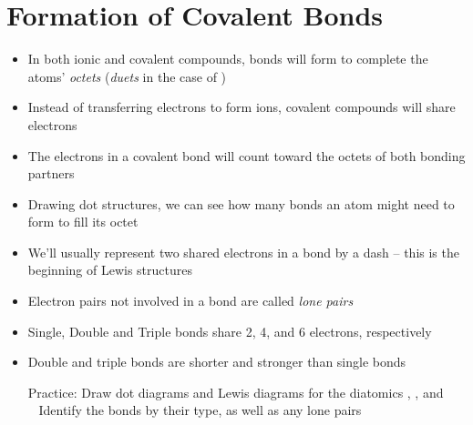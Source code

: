 \documentclass[12pt, openany, letterpaper]{memoir}
\begin{document}
\section{Formation of Covalent Bonds}
\begin{itemize}
	\item In both ionic and covalent compounds, bonds will form to complete the atoms' \emph{octets} (\emph{duets} in the case of )
	\item Instead of transferring electrons to form ions, covalent compounds will share electrons
	\item The electrons in a covalent bond will count toward the octets of both bonding partners
	\item Drawing dot structures, we can see how many bonds an atom might need to form to fill its octet
	\item We'll usually represent two shared electrons in a bond by a dash -- this is the beginning of Lewis structures
	\item Electron pairs not involved in a bond are called \emph{lone pairs}
	\item Single, Double and Triple bonds share 2, 4, and 6 electrons, respectively
	\item Double and triple bonds are shorter and stronger than single bonds

	      Practice: Draw dot diagrams and Lewis diagrams for the diatomics , , and \\
	      ~\hphantom{Practice: } Identify the bonds by their type, as well as any lone pairs
\end{itemize}
\end{document}
